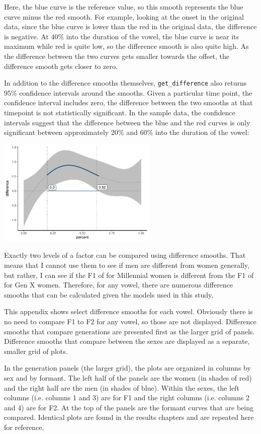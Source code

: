 \noindent
Here, the blue curve is the reference value, so this smooth represents the blue curve minus the red smooth. For example, looking at the onset in the original data, since the blue curve is lower than the red in the original data, the difference is negative. At 40\% into the duration of the vowel, the blue curve is near its maximum while red is quite low, so the difference smooth is also quite high. As the difference between the two curves gets smaller towards the offset, the difference smooth gets closer to zero.

In addition to the difference smooths themselves, \texttt{get\_difference} also returns 95\% confidence intervals around the smooths. Given a particular time point, the confidence interval includes zero, the difference between the two smooths at that timepoint is not statistically significant. In the sample data, the confidence intervals suggest that the difference between the blue and the red curves is only significant between approximately 20\% and 60\% into the duration of the vowel:

\includegraphics[width = 3in]{Figures/example_plots/sample_diff_smooth_sig.pdf}

Exactly two levels of a factor can be compared using difference smooths. That means that I cannot use them to see if men are different from women generally, but rather, I can see if the F1 of \bat for Millennial women is different from the F1 of \bat for Gen X women. Therefore, for any vowel, there are numerous difference smooths that can be calculated given the models used in this study.

This appendix shows select difference smooths for each vowel. Obviously there is no need to compare F1 to F2 for any vowel, so those are not displayed. Difference smooths that compare generations are presented first as the larger grid of panels. Difference smooths that compare between the sexes are displayed as a separate, smaller grid of plots.

In the generation panels (the larger grid), the plots are organized in columns by sex and by formant. The left half of the panels are the women (in shades of red) and the right half are the men (in shades of blue). Within the sexes, the left columns (i.e. columns 1 and 3) are for F1 and the right columns (i.e. columns 2 and 4) are for F2. At the top of the panels are the formant curves that are being compared. Identical plots are found in the results chapters and are repeated here for reference.

